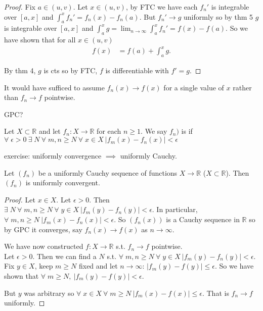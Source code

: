     \begin{proof}
        Fix $a \in (u, v)$.
        Let $x \in (u, v)$, by FTC we have each $f_n'$ is integrable over $[a, x]$ and $\int_{a}^{x} f_n' = f_n(x) - f_n(a)$.
        But $f_n' \to g$ uniformly so by thm 5 $g$ is integrable over $[a, x]$ and $\int_{a}^{x} g = \lim_{n \to \infty} \int_{a}^{x} f_n' = f(x) - f(a)$.
        So we have shown that for all $x \in (u, v)$
        \begin{align*}
            f(x) &= f(a) + \int_a^x g.
        \end{align*} 

        By thm 4, $g$ is cts so by FTC, $f$ is differentiable with $f' = g$.
    \end{proof} 

    \begin{remark}
        It would have sufficed to assume $f_n(x) \to f(x)$ for a single value of $x$ rather than $f_n \to f$ pointwise.
    \end{remark} 

    GPC?

    \begin{definition}
        Let $X \subset \mathbb{R}$ and let $f_n : X \to \mathbb{R}$ for each $n \geq 1$.
        We say $f_n)$ is  if $\forall \; \epsilon > 0 \ \exists \; N \ \forall \; m, n \geq N \ \forall \; x \in X \ |f_m(x) - f_n(x)| < \epsilon$
    \end{definition} 

    exercise: uniformly convergence $\implies$ uniformly Cauchy.

    \begin{theorem}
        Let $(f_n)$ be a uniformly Cauchy sequence of functions $X \to \mathbb{R}$ ($X \subset \mathbb{R}$).
        Then $(f_n)$ is uniformly convergent.
    \end{theorem} 

    \begin{proof}
        Let $x \in X$.
        Let $\epsilon > 0$.
        Then $\exists \; N \ \forall \; m,n \geq N \ \forall \; y \in X \ |f_m(y) - f_n(y)| < \epsilon$.
        In particular, $\forall \; m, n \geq N \ |f_m(x) - f_n(x)| < \epsilon$.
        So $(f_n(x))$ is a Cauchy sequence in $\mathbb{R}$ so by GPC it converges, say $f_n(x) \to f(x)$ as $n \to \infty$. 

        We have now constructed $f : X \to \mathbb{R}$ s.t. $f_n \to f$ pointwise. \\
        Let $\epsilon > 0$.
        Then we can find a $N$ s.t. $\forall \; m, n \geq N \ \forall \; y \in X \ |f_m(y) - f_n(y)| < \epsilon$.
        Fix $y \in X$, keep $m \geq N$ fixed and let $n \to \infty$: $|f_m(y) - f(y)| \leq \epsilon$.
        So we have shown that $\forall \; m \geq N,\ |f_m(y) - f(y)| < \epsilon$.

        But $y$ was arbitrary so $\forall \; x \in X \ \forall \; m \geq N \ |f_m(x) - f(x)| \leq \epsilon$.
        That is $f_n \to f$ uniformly.
    \end{proof} 

